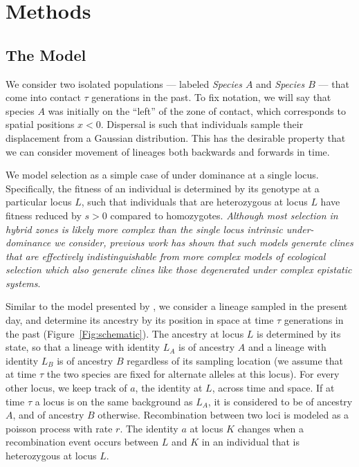 \documentclass[12pt]{article}
\newcommand{\yb}[1]{{\em \color{magenta} #1}}
\begin{document}
	
\section*{Methods}
\subsection*{The Model}
We consider two isolated populations --- labeled \emph{Species $A$} and \emph{Species $B$} ---  that come into contact $\tau$ generations in the past.  To fix notation, we will say that species $A$ was initially on the ``left'' of the zone of contact, which corresponds to spatial positions $x<0$.  
Dispersal is  such that individuals sample their displacement from a Gaussian distribution. This has the desirable property that we can consider movement of lineages both backwards and forwards in time. 	

We model selection as a simple case of under dominance at a single locus.  Specifically, the fitness of an individual is determined by its genotype at a particular locus $L$, such that individuals that are heterozygous at locus $L$ have fitness reduced by $s>0$ compared to homozygotes. \yb{Although most selection in hybrid zones is likely more complex than the single locus intrinsic under-dominance we consider, previous work has shown that such models generate clines that are effectively indistinguishable from more complex models of ecological selection \citep{Barton1989, Barton1993} which also generate clines like those degenerated under complex epistatic systems}. 

Similar to the model presented by \cite{Sedghifar2015}, we consider a lineage sampled in the present day, and determine its ancestry by its position in space at time $\tau$ generations in the past (Figure~\ref{Fig:schematic}). 
The ancestry at locus $L$ is determined by its state, so that a lineage with identity $L_A$ is of ancestry $A$ and a lineage with identity $L_B$ is of ancestry $B$ regardless of its sampling location (we assume that at time $\tau$ the two species are fixed for alternate alleles at this locus). 
For every other locus, we keep track of $a$, the identity at $L$, across time and space. If at time $\tau$ a locus is on the same background as $L_A$, it is considered to be of ancestry $A$, and of ancestry $B$ otherwise. Recombination between two loci is modeled as a poisson process with rate $r$. The identity $a$ at locus $K$ changes when a recombination event occurs between $L$ and $K$ in an individual that is heterozygous at locus $L$. 
\end{document}
